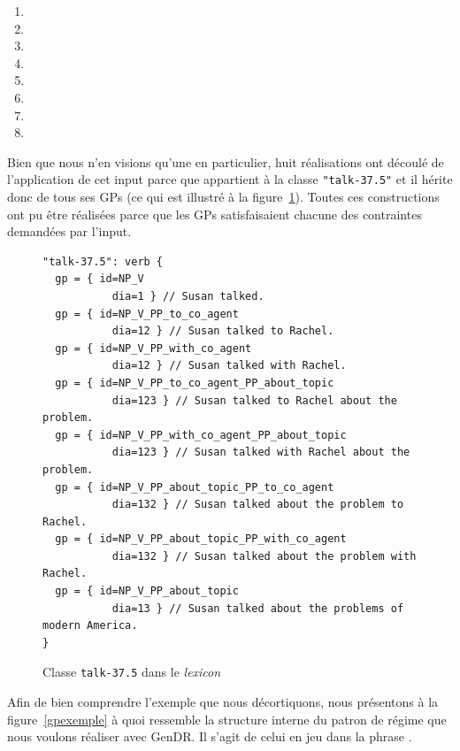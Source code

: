 \begin{enumerate}
  \item {}
  \item {}
  \item {}
  \item {}
  \item {}
  \item {}
  \item {}
  \item {}
\end{enumerate}

Bien que nous n'en visions qu'une en particulier, huit réalisations ont découlé de l'application de cet input parce que  appartient à la classe \texttt{"talk-37.5"} et il hérite donc de tous ses \acp{GP} (ce qui est illustré à la figure~\ref{fig:classtalk375}). Toutes ces constructions ont pu être réalisées parce que les \acp{GP} satisfaisaient chacune des contraintes demandées par l'input.

\begin{figure}[htb]
\begin{lstlisting}[language=mate]
"talk-37.5": verb {
  gp = { id=NP_V
	       dia=1 } // Susan talked.
  gp = { id=NP_V_PP_to_co_agent
	       dia=12 } // Susan talked to Rachel.
  gp = { id=NP_V_PP_with_co_agent
	       dia=12 } // Susan talked with Rachel.
  gp = { id=NP_V_PP_to_co_agent_PP_about_topic
	       dia=123 } // Susan talked to Rachel about the problem.
  gp = { id=NP_V_PP_with_co_agent_PP_about_topic
	       dia=123 } // Susan talked with Rachel about the problem.
  gp = { id=NP_V_PP_about_topic_PP_to_co_agent
	       dia=132 } // Susan talked about the problem to Rachel.
  gp = { id=NP_V_PP_about_topic_PP_with_co_agent
	       dia=132 } // Susan talked about the problem with Rachel.
  gp = { id=NP_V_PP_about_topic
	       dia=13 } // Susan talked about the problems of modern America.
}
\end{lstlisting}
  \caption{Classe \texttt{talk-37.5} dans le \emph{lexicon}}
	\label{fig:classtalk375}
\end{figure}

Afin de bien comprendre l'exemple que nous décortiquons, nous présentons à la figure~\ref{gpexemple} à quoi ressemble la structure interne du patron de régime que nous voulons réaliser avec GenDR. Il s'agit de celui en jeu dans la phrase .

